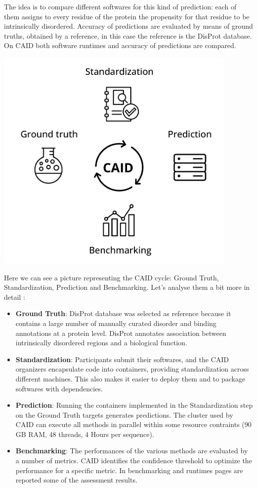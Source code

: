 The idea is to compare different softwares for this kind of prediction: each of them assigns to every residue of the protein the propensity for that residue to be intrinsically disordered. Accuracy of predictions are evaluated by means of ground truths, obtained by a reference, in this case the reference is the DisProt database. On CAID both software runtimes and accuracy of predictions are compared.

\includegraphics[scale=.5]{res/caid_cycle.png}

Here we can see a picture representing the CAID cycle: Ground Truth, Standardization, Prediction and Benchmarking. Let's analyse them a bit more in detail :
\begin{itemize}
    \item \textbf{Ground Truth}: DisProt database was selected as reference because it contains a large number of manually curated disorder and binding annotations at a protein level. DisProt annotates association between intrinsically disordered regions and a biological function.
    \item \textbf{Standardization}: Participants submit their softwares, and the CAID organizers encapsulate code into containers, providing standardization across different machines. This also makes it easier to deploy them and to package softwares with dependencies.
    \item \textbf{Prediction}: Running the containers implemented in the Standardization step on the Ground Truth targets generates predictions. The cluster used by CAID can execute all methods in parallel within some resource contraints (90 GB RAM, 48 threads, 4 Hours per sequence).
    \item \textbf{Benchmarking}: The performances of the various methods are evaluated by a number of metrics. CAID identifies the confidence threshold to optimize the performance for a specific metric. In benchmarking and runtimes pages are reported some of the assessment results.
\end{itemize}

